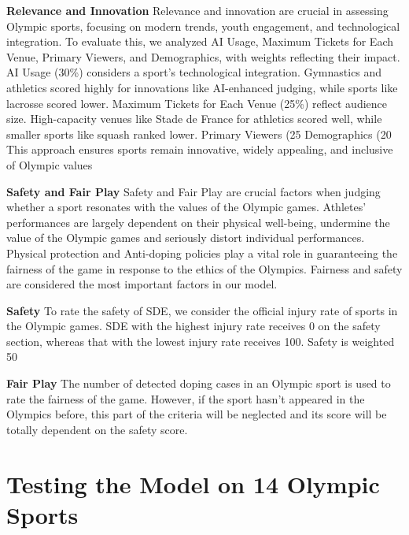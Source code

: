 \documentclass[12pt]{article}
\begin{document}
\textbf{Relevance and Innovation}
Relevance and innovation are crucial in assessing Olympic sports, focusing on modern trends, youth engagement, and technological integration. To evaluate this, we analyzed AI Usage, Maximum Tickets for Each Venue, Primary Viewers, and Demographics, with weights reflecting their impact.
AI Usage (30\%) considers a sport’s technological integration. Gymnastics and athletics scored highly for innovations like AI-enhanced judging, while sports like lacrosse scored lower.
Maximum Tickets for Each Venue (25\%) reflect audience size. High-capacity venues like Stade de France for athletics scored well, while smaller sports like squash ranked lower.
Primary Viewers (25%
Demographics (20%
This approach ensures sports remain innovative, widely appealing, and inclusive of Olympic values

\textbf{Safety and Fair Play}
Safety and Fair Play are crucial factors when judging whether a sport resonates with the values of the Olympic games. Athletes' performances are largely dependent on their physical well-being, undermine the value of the Olympic games and seriously distort individual performances. Physical protection and Anti-doping policies play a vital role in guaranteeing the fairness of the game in response to the ethics of the Olympics. Fairness and safety are considered the most important factors in our model.

\textbf{Safety}
To rate the safety of SDE, we consider the official injury rate of sports in the Olympic games. SDE with the highest injury rate receives 0 on the safety section, whereas that with the lowest injury rate receives 100. Safety is weighted 50%

\textbf{Fair Play}
The number of detected doping cases in an Olympic sport is used to rate the fairness of the game. However, if the sport hasn't appeared in the Olympics before, this part of the criteria will be neglected and its score will be totally dependent on the safety score.

\section{Testing the Model on 14 Olympic Sports}
\end{document}
